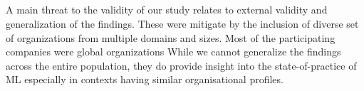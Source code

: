 
\DIFaddbegin \subsection{}
\DIFaddend A main threat to the validity of our study relates to external validity and generalization of the findings. These were mitigate by the inclusion of diverse set of organizations from multiple domains and sizes. Most of the participating companies were global organizations %
While we cannot generalize the findings across the entire population, they do provide insight into the state-of-practice of ML especially in contexts having similar organisational profiles. 









